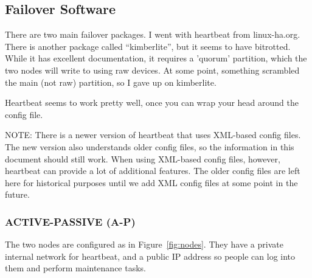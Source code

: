 \documentclass[11pt]{article}
\begin{document}
\subsection{Failover Software}

There are two main failover packages.  I went with heartbeat from
linux-ha.org.  There is another package called ``kimberlite'', but it
seems to have bitrotted.  While it has excellent documentation, it
requires a 'quorum' partition, which the two nodes will write to using
raw devices.  At some point, something scrambled the main (not raw)
partition, so I gave up on kimberlite.  

Heartbeat seems to work pretty well, once you can wrap your head around
the config file.

NOTE: There is a newer version of heartbeat that uses XML-based config
files.  The new version also understands older config files, so the
information in this document should still work.  When using XML-based
config files, however, heartbeat can provide a lot of additional
features.  The older config files are left here for historical purposes
until we add XML config files at some point in the future.


\subsubsection{ACTIVE-PASSIVE (A-P)}

The two nodes are configured as in Figure~\ref{fig:nodes}.  They have a
private internal network for heartbeat, and a public IP address so
people can log into them and perform maintenance tasks.
\end{document}
